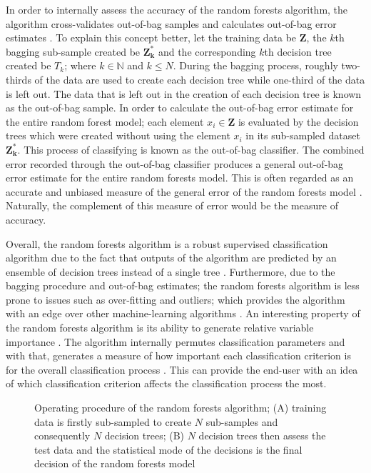 \justify
In order to internally assess the accuracy of the random forests algorithm, the algorithm cross-validates out-of-bag samples and calculates out-of-bag error estimates \citep{Breiman2001}. To explain this concept better, let the training data be $\mathbf{Z}$, the $k$th bagging sub-sample created be $\mathbf{Z^*_k}$ and the corresponding $k$th decision tree created be $T_k$; where $k \in \mathbb{N}$ and $k \leq N$. During the bagging process, roughly two-thirds of the data are used to create each decision tree while one-third of the data is left out. The data that is left out in the creation of each decision tree is known as the out-of-bag sample. In order to calculate the out-of-bag error estimate for the entire random forest model; each element $x_i \in \mathbf{Z}$ is evaluated by the decision trees which were created without using the element $x_i$ in its sub-sampled dataset $\mathbf{Z^*_k}$. This process of classifying is known as the out-of-bag classifier. The combined error recorded through the out-of-bag classifier produces a general out-of-bag error estimate for the entire random forests model. This is often regarded as an accurate and unbiased measure of the general error of the random forests model \citep{Breiman2001}. Naturally, the complement of this measure of error would be the measure of accuracy. 

\justify
Overall, the random forests algorithm is a robust supervised classification algorithm due to the fact that outputs of the algorithm are predicted by an ensemble of decision trees instead of a single tree \citep{Machado2015}. Furthermore, due to the bagging procedure and out-of-bag estimates; the random forests algorithm is less prone to issues such as over-fitting and outliers; which provides the algorithm with an edge over other machine-learning algorithms \citep{Machado2015}. An interesting property of the random forests algorithm is its ability to generate relative variable importance \citep{Machado2015}. The algorithm internally permutes classification parameters and with that, generates a measure of how important each classification criterion is for the overall classification process \citep{Breiman2001}. This can provide the end-user with an idea of which classification criterion affects the classification process the most.

\begin{figure}[H]
	\centering
	{
		\setlength{\fboxsep}{10pt}%
		\setlength{\fboxrule}{0.01pt}%
		\fbox{\texttt{[image: M2015\_5]}} 
	}
	\caption{Operating procedure of the random forests algorithm; (A) training data is firstly sub-sampled to create $N$ sub-samples and consequently $N$ decision trees; (B) $N$ decision trees then assess the test data and the statistical mode of the decisions is the final decision of the random forests model \citep{Machado2015}}\label{fig15}
\end{figure}
\vspace{-18pt}

